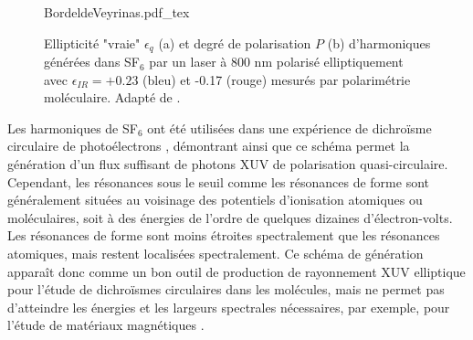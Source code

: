 \begin{figure}
\centering
\def\svgwidth{\textwidth}
{BordeldeVeyrinas.pdf_tex}
\caption{Ellipticité "vraie" $\epsilon_q$ (a) et degré de polarisation $P$ (b) d'harmoniques générées dans SF$_6$ par un laser à 800 nm polarisé elliptiquement avec $\epsilon_{IR} = +0.23$ (bleu) et -0.17 (rouge) mesurés par polarimétrie moléculaire. Adapté de .}
\label{fig:ResultatsFaradSF6}
\end{figure}

Les harmoniques de SF$_6$ ont été utilisées dans une expérience de dichroïsme circulaire de photoélectrons , démontrant ainsi que ce schéma permet la génération d'un flux suffisant de photons XUV de polarisation quasi-circulaire. Cependant, les résonances sous le seuil comme les résonances de forme sont généralement situées au voisinage des potentiels d'ionisation atomiques ou moléculaires, soit à des énergies de l'ordre de quelques dizaines d'électron-volts. Les résonances de forme sont moins étroites spectralement que les résonances atomiques, mais restent localisées spectralement. Ce schéma de génération apparaît donc comme un bon outil de production de rayonnement XUV elliptique pour l'étude de dichroïsmes circulaires dans les molécules, mais ne permet pas d'atteindre les énergies et les largeurs spectrales nécessaires, par exemple, pour  l'étude de matériaux magnétiques .

